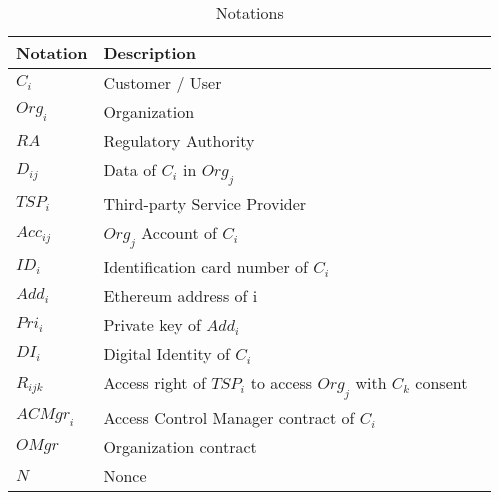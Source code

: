 \begin{table}[h]
    \centering
    \caption[Notations]{Notations}
    \label{table:notation}
    \begin{tabular}{lll}
    \toprule[1.1pt]
    Notation   & Description\\
    \midrule[1.1pt]
    \multirow{1}{*}{\(C_i\)} & Customer / User\\
    \midrule
    \multirow{1}{*}{\(Org_i\)} & Organization\\
    \midrule
    \multirow{1}{*}{\(RA\)} & Regulatory Authority\\
    \midrule
    \multirow{1}{*}{\(D_{ij}\)} & Data of \(C_i\) in \(Org_j\)\\
    \midrule
    \multirow{1}{*}{\({TSP}_i\)} & Third-party Service Provider\\
    \midrule
    \multirow{1}{*}{\({Acc}_{ij}\)} & \(Org_j\) Account of \(C_i\)\\
    \midrule
    \multirow{1}{*}{\({ID}_i\)} & Identification card number of \(C_i\)\\
    \midrule
    \multirow{1}{*}{\({Add}_i\)} & Ethereum address of i\\
    \midrule
    \multirow{1}{*}{\({Pri}_i\)} & Private key of \({Add}_i\)\\
    \midrule
    \multirow{1}{*}{\({DI}_i\)} & Digital Identity of \(C_i\)\\
    \midrule
    \multirow{1}{*}{\({R}_{ijk}\)} & Access right of \({TSP}_i\) to access \({Org}_j\) with \(C_k\) consent\\
    \midrule
    \multirow{1}{*}{\({ACMgr}_i\)} & Access Control Manager contract of \(C_i\) \\
    \midrule
    \multirow{1}{*}{\({OMgr}\)} & Organization contract \\
    \midrule
    \multirow{1}{*}{\({N}\)} & Nonce \\
    \bottomrule[1.1pt]
    \end{tabular}
    \end{table}